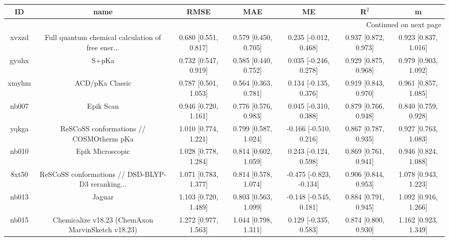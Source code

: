 \documentclass{article}
\begin{document}
\begin{center}
\begin{longtable}{|ccccccc|}
\toprule
    ID &                                               name &                  RMSE &                   MAE &                       ME &                 R$^2$ &                      m \\
\midrule
\endhead
\midrule
\multicolumn{7}{r}{{Continued on next page}} \\
\midrule
\endfoot

\bottomrule
\endlastfoot
 xvxzd &  Full quantum chemical calculation of free ener... &  0.680 [0.551, 0.817] &  0.579 [0.450, 0.705] &    0.235 [-0.012, 0.468] &  0.937 [0.872, 0.973] &   0.923 [0.837, 1.016] \\
 gyuhx &                                              S+pKa &  0.732 [0.547, 0.919] &  0.585 [0.440, 0.752] &    0.035 [-0.246, 0.278] &  0.929 [0.875, 0.968] &   0.979 [0.903, 1.092] \\
 xmyhm &                                    ACD/pKa Classic &  0.787 [0.501, 1.053] &  0.564 [0.363, 0.781] &    0.134 [-0.135, 0.376] &  0.919 [0.843, 0.970] &   0.961 [0.857, 1.085] \\
 nb007 &                                          Epik Scan &  0.946 [0.720, 1.161] &  0.776 [0.576, 0.983] &    0.045 [-0.310, 0.388] &  0.879 [0.766, 0.948] &   0.840 [0.759, 0.928] \\
 yqkga &            ReSCoSS conformations // COSMOtherm pKa &  1.010 [0.774, 1.221] &  0.799 [0.587, 1.024] &   -0.166 [-0.510, 0.216] &  0.867 [0.787, 0.935] &   0.927 [0.763, 1.083] \\
 nb010 &                                   Epik Microscopic &  1.028 [0.778, 1.284] &  0.814 [0.602, 1.059] &    0.243 [-0.124, 0.598] &  0.869 [0.761, 0.941] &   0.946 [0.824, 1.088] \\
 8xt50 &  ReSCoSS conformations // DSD-BLYP-D3 reranking... &  1.071 [0.783, 1.377] &  0.814 [0.578, 1.074] &  -0.475 [-0.823, -0.134] &  0.906 [0.844, 0.953] &   1.078 [0.943, 1.223] \\
 nb013 &                                             Jaguar &  1.103 [0.720, 1.489] &  0.803 [0.563, 1.099] &   -0.148 [-0.545, 0.181] &  0.884 [0.791, 0.945] &   1.092 [0.916, 1.266] \\
 nb015 &  Chemicalize v18.23 (ChemAxon MarvinSketch v18.23) &  1.272 [0.977, 1.563] &  1.044 [0.798, 1.311] &    0.129 [-0.335, 0.583] &  0.874 [0.800, 0.930] &   1.162 [0.923, 1.349] \\

\end{longtable}
\end{center}
\end{document}
